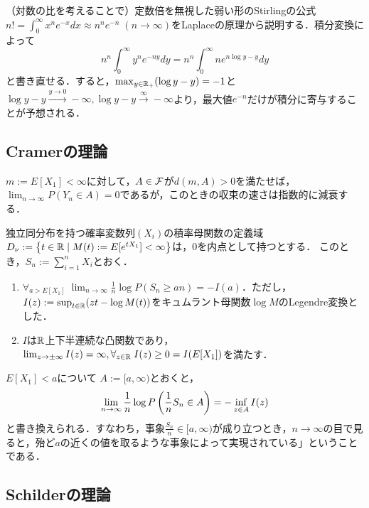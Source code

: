 \documentclass[uplatex,dvipdfmx]{jsreport}
\begin{document}
\begin{example}
    （対数の比を考えることで）定数倍を無視した弱い形のStirlingの公式$n!=\int^\infty_0x^ne^{-x}dx\approx n^ne^{-n}\;(n\to\infty)$をLaplaceの原理から説明する．積分変換によって
    \[n^n\int^\infty_0y^ne^{-ny}dy=n^n\int^\infty_0ne^{n\log y-y}dy\]
    と書き直せる．すると，$\max_{y\in\mathbb{R}_+}(\log y-y)=-1$と$\log y-y\xrightarrow{y\to 0}-\infty,\log y-y\xrightarrow{\infty}-\infty$より，最大値$e^{-n}$だけが積分に寄与することが予想される．
\end{example}

\subsection{Cramerの理論}

\begin{tcolorbox}[colframe=ForestGreen, colback=ForestGreen!10!white,breakable,colbacktitle=ForestGreen!40!white,coltitle=black,fonttitle=\bfseries\sffamily,
title=]
    $m:=E[X_1]<\infty$に対して，$A\in\mathcal{F}$が$d(m,A)>0$を満たせば，$\lim_{n\to\infty}P(Y_n\in A)=0$であるが，このときの収束の速さは指数的に減衰する．
\end{tcolorbox}

\begin{theorem}
    独立同分布を持つ確率変数列$(X_i)$の積率母関数の定義域$D_\nu:=\left\{t\in\mathbb{R}\mid M(t):=E[e^{tX_1}]<\infty\right\}$は，$0$を内点として持つとする．
    このとき，$S_n:=\sum_{i=1}^nX_i$とおく．
    \begin{enumerate}
        \item $\forall_{a>E[X_1]}\;\lim_{n\to\infty}\frac{1}{n}\log P(S_n\ge an)=-I(a)$．ただし，$I(z):=\sup_{t\in\mathbb{R}}(zt-\log M(t))$をキュムラント母関数$\log M$のLegendre変換とした．
        \item $I$は$\mathbb{R}$上下半連続な凸関数であり，$\lim_{z\to\pm\infty}I(z)=\infty,\forall_{z\in\mathbb{R}}\;I(z)\ge 0=I(E[X_1])$を満たす．
    \end{enumerate}
\end{theorem}
\begin{remarks}
    $E[X_1]<a$について
    $A:=[a,\infty)$とおくと，
    \[\lim_{n\to\infty}\frac{1}{n}\log P\left(\frac{1}{n}S_n\in A\right)=-\inf_{z\in A}I(z)\]
    と書き換えられる．すなわち，事象$\frac{S_n}{n}\in[a,\infty)$が成り立つとき，$n\to\infty$の目で見ると，殆ど$a$の近くの値を取るような事象によって実現されている」ということである．

\end{remarks}

\subsection{Schilderの理論}
\end{document}
